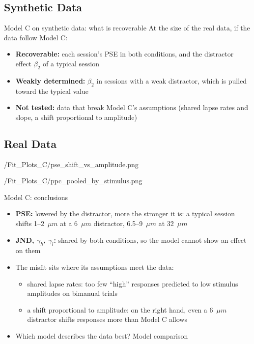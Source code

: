 \subsection{Synthetic Data}

\begin{frame}{Model C on synthetic data: what is recoverable}
  At the size of the real data, if the data follow Model C:
  \begin{itemize}
    \item \textbf{Recoverable:} each session's PSE in both conditions, and the distractor
          effect $\beta_2$ of a typical session
    \item \textbf{Weakly determined:} $\beta_2$ in sessions with a weak distractor, which is
          pulled toward the typical value
    \item \textbf{Not tested:} data that break Model C's assumptions (shared lapse rates and
          slope, a shift proportional to amplitude)
  \end{itemize}
\end{frame}

\subsection{Real Data}

  {\plotsC/Fit_Plots_C/pse_shift_vs_amplitude.png}

  {\plotsC/Fit_Plots_C/ppc_pooled_by_stimulus.png}

\begin{frame}{Model C: conclusions}
  \begin{itemize}
    \item \textbf{PSE:} lowered by the distractor, more the stronger it is: a typical session
          shifts 1--2~$\mu m$ at a 6~$\mu m$ distractor, 6.5--9~$\mu m$ at 32~$\mu m$
    \item \textbf{JND, \boldmath$\gamma_h$, \boldmath$\gamma_l$:} shared by both conditions, so
          the model cannot show an effect on them
    \item The misfit sits where its assumptions meet the data:
    \begin{itemize}
      \item shared lapse rates: too few ``high'' responses predicted to low stimulus amplitudes on
            bimanual trials
      \item a shift proportional to amplitude: on the right hand, even a 6~$\mu m$ distractor
            shifts responses more than Model C allows
    \end{itemize}
    \item[$\Rightarrow$] Which model describes the data best? Model comparison
  \end{itemize}
\end{frame}
